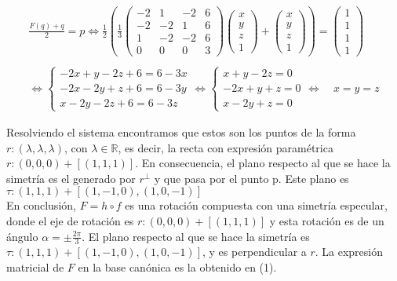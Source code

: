 \begin{gather*}
    \frac{F(q) + q}{2} = p \Longleftrightarrow \frac{1}{2}(\frac{1}{3}    
    \begin{pmatrix}
    -2 & 1 & -2 & 6\\
    -2 & -2 & 1 & 6\\
    1 & -2 & -2 & 6\\
    0 & 0 & 0 & 3
    \end{pmatrix}
    \begin{pmatrix} x\\y\\z\\1 \end{pmatrix} + \begin{pmatrix} x\\y\\z\\1 \end{pmatrix}) = \begin{pmatrix}1\\1\\1\\1 \end{pmatrix}
    \\
    \\
    \Longleftrightarrow
    \begin{cases}
    -2x+y-2z+6=6-3x\\ -2x-2y+z+6=6-3y\\ x-2y-2z+6=6-3z
    \end{cases}
    \Longleftrightarrow
    \begin{cases}
    x+y-2z = 0\\ -2x+y+z=0\\ x-2y+z = 0
    \end{cases}
    \Longleftrightarrow \quad x=y=z
\end{gather*}

Resolviendo el sistema encontramos que estos son los puntos de la forma $r: (\lambda, \lambda, \lambda)$, con $\lambda \in \mathbb{R}$, es decir, la recta con expresión paramétrica $r: (0,0,0) + [(1,1,1)]$. En consecuencia, el plano respecto al que se hace la simetría es el generado por $r^{\perp}$ y que pasa por el punto p. Este plano es $\tau: (1,1,1) + [(1,-1,0),(1,0,-1)]$
\\

En conclusión, $F = h \circ f$ es una rotación compuesta con una simetría especular, donde el eje de rotación es $r: (0,0,0) + [(1,1,1)]$ y esta rotación es de un ángulo $\alpha = \pm \frac{2\pi}{3}$. El plano respecto al que se hace la simetría es $\tau: (1,1,1) + [(1,-1,0),(1,0,-1)]$, y es perpendicular a $r$. La expresión matricial de $F$ en la base canónica es la obtenido en (1).
\\

